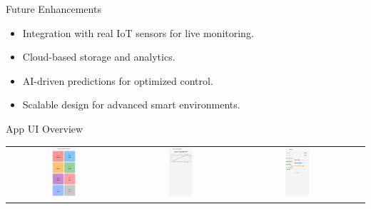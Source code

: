 \documentclass[aspectratio=169]{beamer}
\begin{document}
\begin{frame}{Future Enhancements}
\begin{itemize}
    \item Integration with real IoT sensors for live monitoring.
    \item Cloud-based storage and analytics.
    \item AI-driven predictions for optimized control.
    \item Scalable design for advanced smart environments.
\end{itemize}
\end{frame}

\begin{frame}{App UI Overview}
\centering
\begin{tabular}{cccc}
\vspace{0.5cm}
    \includegraphics[width=0.22\textwidth]{app4.jpeg} &
    \includegraphics[width=0.22\textwidth]{app5.jpeg} &
    \includegraphics[width=0.22\textwidth]{app2.jpeg}&

\end{tabular}
\end{frame}
\end{document}
